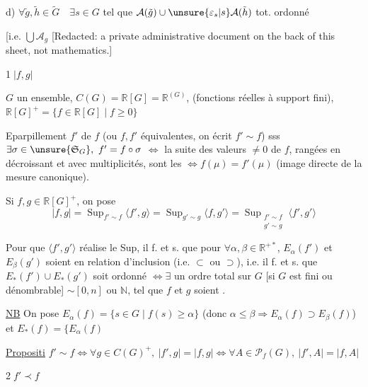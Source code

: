 d) $\forall\tilde g,\tilde h\in\tilde G\quad\exists s\in G$ tel que $\mathcal A(\tilde g)\cup\unsure{\varepsilon_s|s}\mathcal A(\tilde h)$ tot. ordonné

[i.e. $\bigcup\mathcal A_g$
[Redacted: a private administrative document on the back of this sheet, not mathematics.]

\textcircled{1}\quad $|f,g|$

 $G$ un ensemble, $C(G)=\mathbb R[G]=\mathbb R^{(G)}$, (fonctions réelles à support fini), $\mathbb R[G]^+=\{f\in\mathbb R[G]\mid f\geq0\}$

 Eparpillement $f'$ de $f$ (ou $f,f'$ équivalentes, on écrit $f'\sim f$) sss $\exists\sigma\in\unsure{\mathfrak S_G},\ f'=f\circ\sigma$ $\Longleftrightarrow$ la suite des valeurs $\ne0$ de $f$,  rangées en décroissant et avec multiplicités, sont les  $\Longleftrightarrow f(\mu)=f'(\mu)$ (image directe de la mesure canonique).

Si $f,g\in\mathbb R[G]^+$, on pose
\[
|f,g|=\operatorname{Sup}_{f'\sim f}\langle f',g\rangle
=\operatorname{Sup}_{g'\sim g}\langle f,g'\rangle
=\operatorname{Sup}_{\substack{f'\sim f\\g'\sim g}}\langle f',g'\rangle
\]

 Pour que $\langle f',g'\rangle$ réalise le Sup, il f. et s. que pour $\forall\alpha,\beta\in\mathbb R^{+\ast}$, $E_\alpha(f')$ et $E_\beta(g')$ soient en relation d'inclusion (i.e. $\subset$ ou $\supset$), i.e. il f. et s. que $E_\ast(f')\cup E_\ast(g')$ soit  ordonné $\Longleftrightarrow\exists$ un ordre total sur $G$ [si $G$ est fini ou dénombrable] $\sim[0,n]$ ou $\mathbb N$, tel que $f$ et $g$ soient .

\uline{NB} On pose $E_\alpha(f)=\{s\in G\mid f(s)\geq\alpha\}$ (donc $\alpha\leq\beta\Rightarrow E_\alpha(f)\supset E_\beta(f)$) et $E_\ast(f)=\{E_\alpha(f)$


\uline{Propositi} $f'\sim f\Longleftrightarrow\forall g\in C(G)^+,\ |f',g|=|f,g|\Longleftrightarrow\forall A\in\mathcal P_f(G),\ |f',A|=|f,A|$

\textcircled{2}\quad \uline{$f'\prec f$}

